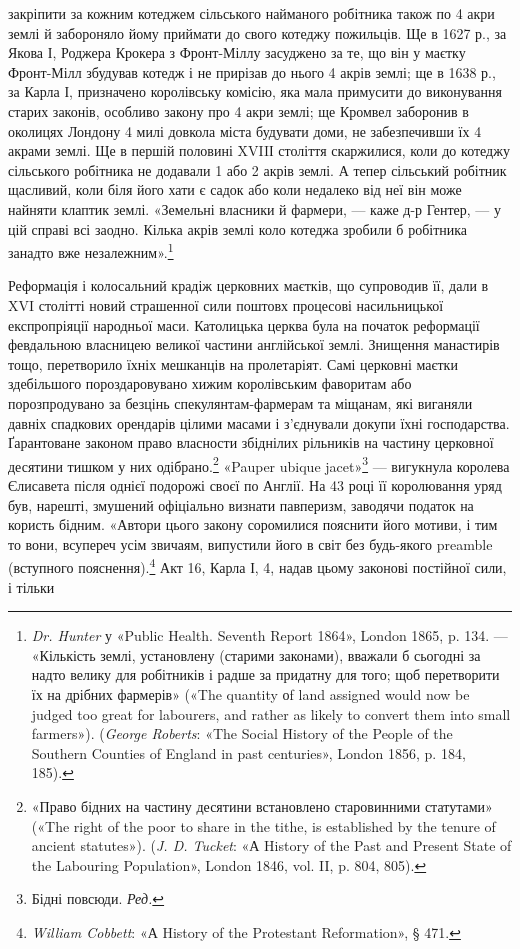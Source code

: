 \parcont{}  %
закріпити за кожним котеджем сільського найманого робітника
також по 4 акри землі й забороняло йому приймати до свого
котеджу пожильців. Ще в 1627 р., за Якова І, Роджера Крокера
з Фронт-Міллу засуджено за те, що він у маєтку Фронт-Мілл
збудував котедж і не прирізав до нього 4 акрів землі; ще в 1638 р.,
за Карла І, призначено королівську комісію, яка мала примусити
до виконування старих законів, особливо закону про 4 акри
землі; ще Кромвел заборонив в околицях Лондону 4 милі довкола
міста будувати доми, не забезпечивши їх 4 акрами землі. Ще в
першій половині XVIIІ століття скаржилися, коли до котеджу
сільського робітника не додавали 1 або 2 акрів землі. А тепер
сільський робітник щасливий, коли біля його хати є садок або
коли недалеко від неї він може найняти клаптик землі. «Земельні
власники й фармери, — каже д-р Гентер, — у цій справі всі заодно.
Кілька акрів землі коло котеджа зробили б робітника
занадто вже незалежним».\footnote{
\emph{Dr. Hunter} у «Public Health. Seventh Report 1864», London 1865,
p. 134. — «Кількість землі, установлену (старими законами), вважали б
сьогодні за надто велику для робітників і радше за придатну для того;
щоб перетворити їх на дрібних фармерів» («The quantity оf land assigned
would now be judged too great for labourers, and rather as likely to
convert them into small farmers»). (\emph{George Roberts}: «The Social History
of the People of the Southern Counties of England in past centuries», London
1856, p. 184, 185).
}

Реформація і колосальний крадіж церковних маєтків, що
супроводив її, дали в XVI столітті новий страшенної сили поштовх
процесові насильницької експропріяції народньої маси.
Католицька церква була на початок реформації февдальною
власницею великої частини англійської землі. Знищення манастирів
тощо, перетворило їхніх мешканців на пролетаріят.
Самі церковні маєтки здебільшого пороздаровувано хижим королівським
фаворитам або порозпродувано за безцінь спекулянтам-фармерам
та міщанам, які виганяли давніх спадкових орендарів
цілими масами і з’єднували докупи їхні господарства. Ґарантоване
законом право власности збіднілих рільників на частину
церковної десятини тишком у них одібрано.\footnote{
«Право бідних на частину десятини встановлено старовинними
статутами» («The right of the poor to share in the tithe, is established by
the tenure of ancient statutes»). (\emph{J. D. Tucket}: «А History of the Past
and Present State of the Labouring Population», London 1846, vol. II,
p. 804, 805).
} «Pauper ubique
jacet»\footnote*{
Бідні повсюди. \emph{Ред.}
} — вигукнула королева Єлисавета після однієї подорожі
своєї по Англії. На 43 році її королювання уряд був, нарешті,
змушений офіціально визнати павперизм, заводячи податок на
користь бідним. «Автори цього закону соромилися пояснити
його мотиви, і тим то вони, всупереч усім звичаям, випустили
його в світ без будь-якого preamble (вступного пояснення).\footnote{
\emph{William Cobbett}: «А History of the Protestant Reformation», § 471.
}
Акт 16, Карла І, 4, надав цьому законові постійної сили, і тільки
\parbreak{}  %
